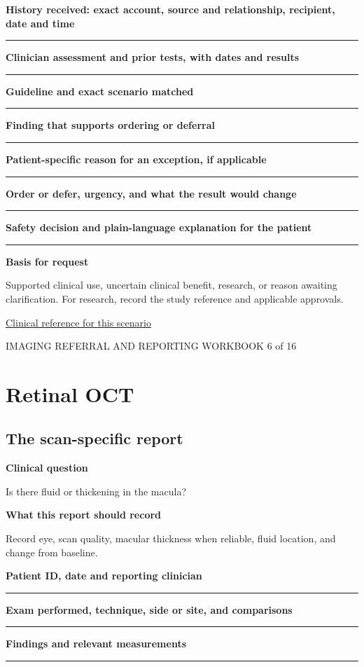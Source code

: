 \documentclass[11pt,a4paper]{article}
\newcommand{\record}[1]{\textbf{#1}\par\vspace{0.55\baselineskip}\hrule\vspace{0.35\baselineskip}}
\begin{document}
\record{History received: exact account, source and relationship, recipient, date and time}

\record{Clinician assessment and prior tests, with dates and results}

\record{Guideline and exact scenario matched}

\record{Finding that supports ordering or deferral}

\record{Patient-specific reason for an exception, if applicable}

\record{Order or defer, urgency, and what the result would change}

\record{Safety decision and plain-language explanation for the patient}

\textbf{Basis for request}\par Supported clinical use, uncertain clinical benefit, research, or reason awaiting clarification. For research, record the study reference and applicable approvals.\par

\small\href{https://www.aaojournal.org/article/S0161-6420(19)32902-5/fulltext/}{Clinical reference for this scenario}

\normalsize

\newpage

{\small IMAGING REFERRAL AND REPORTING WORKBOOK \hfill 6 of 16}

\section*{Retinal OCT}

\subsection*{The scan-specific report}

\textbf{Clinical question}\par Is there fluid or thickening in the macula?\par

\textbf{What this report should record}\par Record eye, scan quality, macular thickness when reliable, fluid location, and change from baseline.\par

\record{Patient ID, date and reporting clinician}

\record{Exam performed, technique, side or site, and comparisons}

\record{Findings and relevant measurements}
\end{document}
